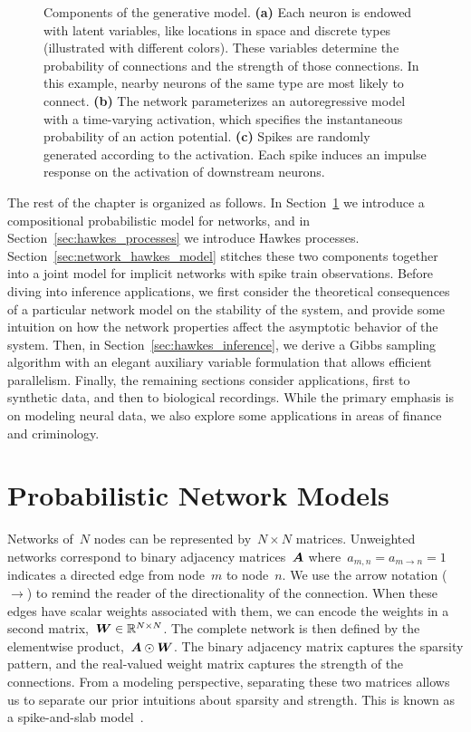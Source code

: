 \begin{figure}[t]
\begin{subfigure}[t]{5.5in}
  \end{subfigure}
  \caption[Components of the network Hawkes model]{
     Components of the generative model. 
     \textbf{(a)} Each neuron is endowed with latent variables, like 
     locations in space and discrete types (illustrated with different colors).
     These variables determine the probability of connections and the 
     strength of those connections. In this example, nearby neurons of the same 
     type are most likely to connect.
     \textbf{(b)} The network parameterizes an autoregressive model 
     with a time-varying activation, which specifies the instantaneous probability 
     of an action potential.
     \textbf{(c)} Spikes are randomly generated according to the 
     activation. Each spike induces an impulse response on the activation 
     of downstream neurons.}
  \label{fig:fig1}
\end{figure}

The rest of the chapter is organized as follows. In
Section~\ref{sec:graph_models} we introduce a compositional
probabilistic model for networks, and in
Section~\ref{sec:hawkes_processes} we introduce Hawkes processes.
Section~\ref{sec:network_hawkes_model} stitches these two components
together into a joint model for implicit networks with spike train
observations.  Before diving into inference applications, we first
consider the theoretical consequences of a particular network model on
the stability of the system, and provide some intuition on how the
network properties affect the asymptotic behavior of the system.
Then, in Section~\ref{sec:hawkes_inference}, we derive a Gibbs
sampling algorithm with an elegant auxiliary variable formulation that
allows efficient parallelism.  Finally, the remaining sections
consider applications, first to synthetic data, and then to biological
recordings.  While the primary emphasis is on modeling neural data, we
also explore some applications in areas of finance and criminology.

\section{Probabilistic Network Models}
\label{sec:graph_models}
Networks of~$N$ nodes can be represented by~${N\times N}$
matrices. Unweighted networks correspond to binary adjacency
matrices~$\boldsymbol{A}$ where~${a_{m,n}=a_{m \to n}=1}$ indicates a directed
edge from node~$m$ to node~$n$. We use the arrow notation ($\to$) to
remind the reader of the directionality of the connection. When these
edges have scalar weights associated with them, we can encode the
weights in a second matrix,~${\boldsymbol{W} \in \mathbb{R}^{N \times N}}$.  The
complete network is then defined by the elementwise product,~${\boldsymbol{A}
  \odot \boldsymbol{W}}$. The binary adjacency matrix captures the sparsity
pattern, and the real-valued weight matrix captures the strength of
the connections. From a modeling perspective, separating these two
matrices allows us to separate our prior intuitions about sparsity and
strength. This is known as a spike-and-slab model~\citep{Mitchell1988}.


